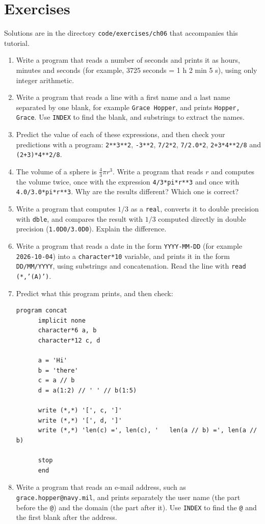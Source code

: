 \section{Exercises}

Solutions are in the directory \texttt{code/exercises/ch06} that accompanies this tutorial.

\begin{enumerate}
    \item Write a program that reads a number of seconds and prints it as hours, minutes and seconds (for example, 3725 seconds = 1 h 2 min 5 s), using only integer arithmetic.
    \item Write a program that reads a line with a first name and a last name separated by one blank, for example \texttt{Grace Hopper}, and prints \texttt{Hopper, Grace}. Use \texttt{INDEX} to find the blank, and substrings to extract the names.
    \item Predict the value of each of these expressions, and then check your predictions with a program: \texttt{2**3**2}, \texttt{-3**2}, \texttt{7/2*2}, \texttt{7/2.0*2}, \texttt{2+3*4**2/8} and \texttt{(2+3)*4**2/8}.
    \item The volume of a sphere is $\frac{4}{3}\pi r^3$. Write a program that reads $r$ and computes the volume twice, once with the expression \texttt{4/3*pi*r**3} and once with \texttt{4.0/3.0*pi*r**3}. Why are the results different? Which one is correct?
    \item Write a program that computes $1/3$ as a \texttt{real}, converts it to double precision with \texttt{dble}, and compares the result with $1/3$ computed directly in double precision (\texttt{1.0D0/3.0D0}). Explain the difference.
    \item Write a program that reads a date in the form \texttt{YYYY-MM-DD} (for example \texttt{2026-10-04}) into a \texttt{character*10} variable, and prints it in the form \texttt{DD/MM/YYYY}, using substrings and concatenation. Read the line with \texttt{read (*,'(A)')}.
    \item Predict what this program prints, and then check:
\begin{lstlisting}[style=fortran77]
      program concat
      implicit none
      character*6 a, b
      character*12 c, d

      a = 'Hi'
      b = 'there'
      c = a // b
      d = a(1:2) // ' ' // b(1:5)

      write (*,*) '[', c, ']'
      write (*,*) '[', d, ']'
      write (*,*) 'len(c) =', len(c), '   len(a // b) =', len(a // b)

      stop
      end
\end{lstlisting}
    \item Write a program that reads an e-mail address, such as \texttt{grace.hopper@navy.mil}, and prints separately the user name (the part before the \texttt{@}) and the domain (the part after it). Use \texttt{INDEX} to find the \texttt{@} and the first blank after the address.
\end{enumerate}
